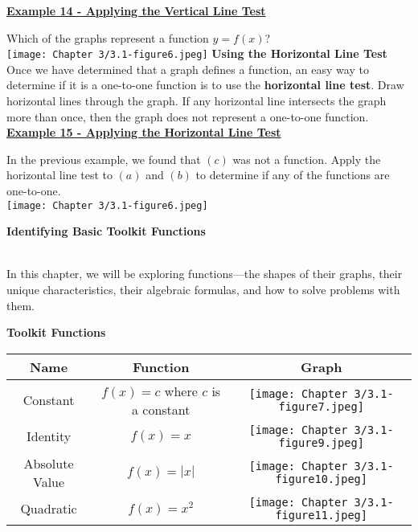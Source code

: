 \documentclass[12pt]{book}
\begin{document}
\underline{\textbf{Example 14 - Applying the Vertical Line Test}}
\vspace{3mm}

Which of the graphs represent a function $y=f(x)$?
\\

\texttt{[image: Chapter 3/3.1-figure6.jpeg]}
\newpage
\textbf{\large Using the Horizontal Line Test}
\\

Once we have determined that a graph defines a function, an easy way to determine if it is a one-to-one function is to use the \textbf{horizontal line test}. Draw horizontal lines through the graph. If any horizontal line intersects the graph more than once, then the graph does not represent a one-to-one function.
\\

\underline{\textbf{Example 15 - Applying the Horizontal Line Test}}
\vspace{3mm}

In the previous example, we found that $(c)$ was not a function. Apply the horizontal line test to $(a)$ and $(b)$ to determine if any of the functions are one-to-one.
\\

\texttt{[image: Chapter 3/3.1-figure6.jpeg]}
\newpage

{\large \textbf{Identifying Basic Toolkit Functions}}

\\

In this chapter, we will be exploring functions—the shapes of their graphs, their unique characteristics, their algebraic formulas, and how to solve problems with them. 


\textbf{Toolkit Functions}
\\

 \begin{tabular}{ |c|c|c| } 
         \hline
              \textbf{Name} & \textbf{Function} & \textbf{Graph} \\
             \hline
             Constant & $f(x)=c$ where $c$ is a constant & \texttt{[image: Chapter 3/3.1-figure7.jpeg]} \\
             \hline
            Identity & $f(x)=x$ & \texttt{[image: Chapter 3/3.1-figure9.jpeg]}\\
            \hline
            Absolute Value & $f(x)=|x|$ & \texttt{[image: Chapter 3/3.1-figure10.jpeg]} \\
            \hline
             Quadratic & $f(x)=x^2$ & \texttt{[image: Chapter 3/3.1-figure11.jpeg]}\\
            \hline
          \end{tabular} 
\end{document}
